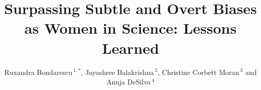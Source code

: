\documentclass[utf8]{frontiersSCNS} %
\def\firstAuthorLast{Bondarescu {et~al.}} %
\def\Authors{Ruxandra Bondarescu\,$^{1,*}$, Jayashree Balakrishna\,$^{2}$, Christine Corbett Moran\,$^{3}$ and Anuja DeSilva\,$^{4}$}
\begin{document}
\onecolumn
{}

\title[Surpassing Subtle and Overt Biases as Women in Science]{Surpassing Subtle and Overt Biases as Women in Science: Lessons Learned}

\author[\firstAuthorLast ]{\Authors} %
\address{} %
\correspondance{} %

\extraAuth{}%


\maketitle
\end{document}
